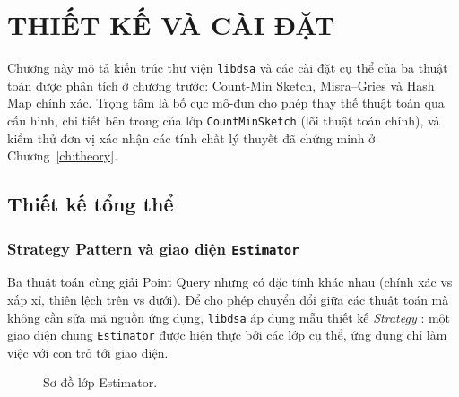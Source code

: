
\chapter{THIẾT KẾ VÀ CÀI ĐẶT}
\label{ch:impl}

Chương này mô tả kiến trúc thư viện \texttt{libdsa} và các cài đặt cụ thể của ba thuật toán được phân tích ở chương trước: Count-Min Sketch, Misra--Gries và Hash Map chính xác. Trọng tâm là bố cục mô-đun cho phép thay thế thuật toán qua cấu hình, chi tiết bên trong của lớp \texttt{CountMinSketch} (lõi thuật toán chính), và kiểm thử đơn vị xác nhận các tính chất lý thuyết đã chứng minh ở Chương~\ref{ch:theory}.

\section{Thiết kế tổng thể}

\subsection{Strategy Pattern và giao diện \texttt{Estimator}}

Ba thuật toán cùng giải Point Query nhưng có đặc tính khác nhau (chính xác vs xấp xỉ, thiên lệch trên vs dưới). Để cho phép chuyển đổi giữa các thuật toán mà không cần sửa mã nguồn ứng dụng, \texttt{libdsa} áp dụng mẫu thiết kế \textit{Strategy} \cite{gamma1995patterns}: một giao diện chung \texttt{Estimator} được hiện thực bởi các lớp cụ thể, ứng dụng chỉ làm việc với con trỏ tới giao diện.

\begin{figure}[H]
  \centering
  \caption{Sơ đồ lớp Estimator.}
  \label{fig:estimator-class}
\end{figure}

